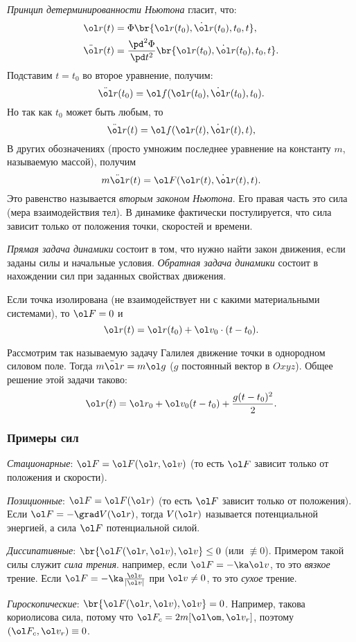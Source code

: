\documentclass[a4paper,12pt]{article}
\def\F{\ol F}
\def\w{\ol\om}
\def\r{\ol r}
\def\v{\ol v}
\def\dd{\ddot}
\def\d{\dot}
\newcommand{\ez}{\equiv0}
\newcommand{\nez}{\not\equiv0}
\begin{document}
\emph{Принцип детерминированности Ньютона} гласит, что:
$$\begin{aligned}
\r(t)&=\Phi \br{\r(t_0),\d \r(t_0), t_0, t},\\
\dd\r(t)&=\frac{\pd^2\Phi}{\pd t^2}\br{\r(t_0),\d\r(t_0), t_0, t}.
\end{aligned}
$$
Подставим $t=t_0$ во второе уравнение, получим:
$$\dd \r(t_0)=\ol f(\r(t_0), \d \r(t_0), t_0).$$
Но так как $t_0$ может быть любым, то
$$
\dd \r(t)=\ol f(\r(t), \d \r(t), t),
$$
В других обозначениях (просто умножим последнее уравнение на константу $m$, называемую массой),
получим
$$m\dd \r(t)=\ol F(\r(t), \d \r(t), t).$$
Это равенство называется \emph{вторым законом Ньютона}. Его правая часть это сила (мера взаимодействия тел).
В динамике фактически постулируется, что сила зависит только от положения точки, скоростей и времени.

\emph{Прямая задача динамики} состоит в том, что нужно найти закон движения, если заданы силы и начальные условия.
\emph{Обратная задача динамики} состоит в нахождении сил при заданных свойствах движения.

\begin{ex}
Если точка изолирована (не взаимодействует ни с какими материальными системами),
то $\ol F=0$ и
$$\r(t)=\r(t_0)+\v_0\cdot(t-t_0).$$
\end{ex}

\begin{ex}
Рассмотрим так называемую задачу Галилея движение точки в однородном силовом поле.
Тогда $m\dd \r=m\ol g$ ($g$ постоянный вектор в $Oxyz$).
Общее решение этой задачи таково:
$$\r(t)=\r_0+\v_0(t-t_0)+\frac{g(t-t_0)^2}{2}.$$
\end{ex}

\subsubsection{Примеры сил}

\begin{nums}{-2}
\item \emph{Стационарные}: $\F=\F(\r,\v)$ (то есть $\F$ зависит только от положения и скорости).
\item \emph{Позиционные}: $\F=\F(\r)$ (то есть $\F$ зависит только от положения).
      Если $\F=-\grad V(\r)$, тогда $V(\r)$ называется потенциальной энергией,
      а сила $\F$ потенциальной силой.
\item \emph{Диссипативные}: $\br{\F(\r,\v),\v} \le 0$ (или $\nez$).
      Примером такой силы служит \emph{сила трения}. например, если $\F=-\ka\v$,
      то это \emph{вязкое} трение. Если $\F=-\ka\frac{\v}{|\v|}$ при $\v\ne0$, то это \emph{сухое} трение.
\item \emph{Гироскопические}: $\br{\F(\r,\v),\v}=0$. Например, такова кориолисова сила,
      потому что $\F_c=2m[\w,\v_r]$, поэтому $(\F_c,\v_r)\ez$.
\end{nums}
\end{document}
